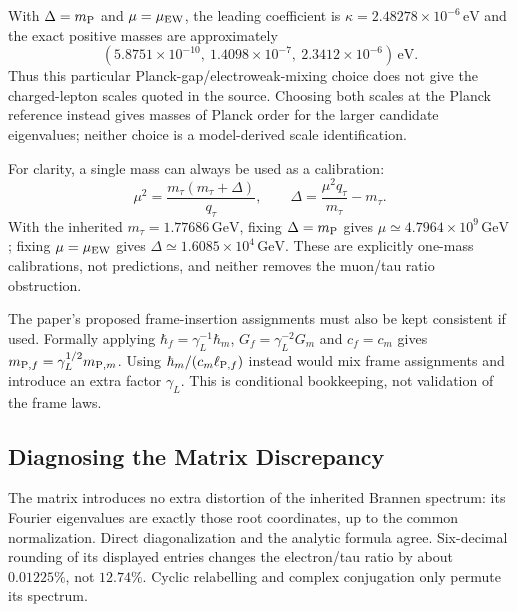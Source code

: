 With $\Delta=m_{\rm P}$ and $\mu=\mu_{\rm EW}$, the leading
coefficient is $\kappa=2.48278\times10^{-6}\,\mathrm{eV}$ and
the exact positive masses are approximately
\[
 (5.8751\times10^{-10},\ 1.4098\times10^{-7},\
  2.3412\times10^{-6})\,\mathrm{eV}.
\]
Thus this particular Planck-gap/electroweak-mixing choice does not
give the charged-lepton scales quoted in the source. Choosing
both scales at the Planck reference instead gives masses of
Planck order for the larger candidate eigenvalues; neither
choice is a model-derived scale identification.

For clarity, a single mass can always be used as a calibration:
\[
 \mu^2=\frac{m_\tau(m_\tau+\Delta)}{q_\tau},\qquad
 \Delta=\frac{\mu^2q_\tau}{m_\tau}-m_\tau.
\]
With the inherited $m_\tau=1.77686\,\mathrm{GeV}$, fixing
$\Delta=m_{\rm P}$ gives $\mu\simeq4.7964\times10^9\,\mathrm{GeV}$;
fixing $\mu=\mu_{\rm EW}$ gives
$\Delta\simeq1.6085\times10^4\,\mathrm{GeV}$.
These are explicitly one-mass calibrations, not predictions, and
neither removes the muon/tau ratio obstruction.

The paper's proposed frame-insertion assignments must also be kept
consistent if used. Formally applying
$\hbar_f=\gamma_L^{-1}\hbar_m$, $G_f=\gamma_L^{-2}G_m$ and
$c_f=c_m$ gives $m_{{\rm P},f}=\gamma_L^{1/2}m_{{\rm P},m}$.
Using $\hbar_m/(c_m\ell_{{\rm P},f})$ instead would mix frame
assignments and introduce an extra factor $\gamma_L$.
This is conditional bookkeeping, not validation of the frame laws.

\subsection{Diagnosing the Matrix Discrepancy}
\label{v480:matrix-phase-diagnosis}

The matrix introduces no extra distortion of the inherited Brannen
spectrum: its Fourier eigenvalues are exactly those root coordinates,
up to the common normalization. Direct diagonalization and the
analytic formula agree. Six-decimal rounding of its displayed entries
changes the electron/tau ratio by about $0.01225\%$, not $12.74\%$.
Cyclic relabelling and complex conjugation only permute its spectrum.

